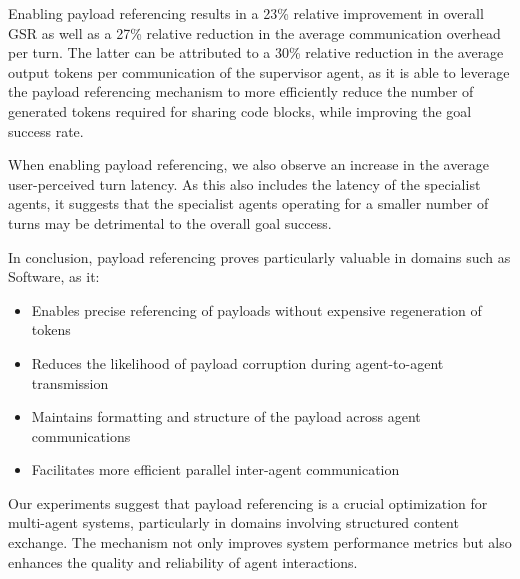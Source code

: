 Enabling payload referencing results in a 23\% relative improvement in overall GSR as well as a 27\% relative reduction in the average communication overhead per turn. The latter can be attributed to a 30\% relative reduction in the average output tokens per communication of the supervisor agent, as it is able to leverage the payload referencing mechanism to more efficiently reduce the number of generated tokens required for sharing code blocks, while improving the goal success rate.

When enabling payload referencing, we also observe an increase in the average user-perceived turn latency. As this also includes the latency of the specialist agents, it suggests that the specialist agents operating for a smaller number of turns may be detrimental to the overall goal success.

In conclusion, payload referencing proves particularly valuable in domains such as Software, as it:

\begin{itemize}
    \item Enables precise referencing of payloads without expensive regeneration of tokens
    \item Reduces the likelihood of payload corruption during agent-to-agent transmission
    \item Maintains formatting and structure of the payload across agent communications
    \item Facilitates more efficient parallel inter-agent communication
\end{itemize}


Our experiments suggest that payload referencing is a crucial optimization for multi-agent systems, particularly in domains involving structured content exchange. The mechanism not only improves system performance metrics but also enhances the quality and reliability of agent interactions.

